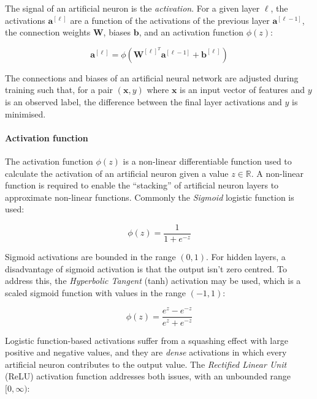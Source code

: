 The signal of an artificial neuron is the \emph{activation}. For a given layer $\ell$, the activations $\bm{a}^{[\ell]}$ are a function of the activations of the previous layer $\bm{a}^{[\ell - 1]}$, the connection weights $\bm{W}$, biases $\bm{b}$, and an activation function $\phi(z)$:

\begin{equation}
  \bm{a}^{[\ell]} = \phi \left( \bm{W}^{[\ell]^T} \bm{a}^{[\ell-1]} + \bm{b}^{[\ell]} \right)
\end{equation}

The connections and biases of an artificial neural network are adjusted during training such that, for a pair $(\bm{x}, y)$ where $\bm{x}$ is an input vector of features and $y$ is an observed label, the difference between the final layer activations and $y$ is minimised.


\paragraph*{Activation function}

The activation function $\phi(z)$ is a non-linear differentiable function used to calculate the activation of an artificial neuron given a value $z \in \mathbb{R}$. A non-linear function is required to enable the ``stacking'' of artificial neuron layers to approximate non-linear functions. Commonly the \emph{Sigmoid} logistic function is used:

\begin{equation}
  \phi(z) = \frac{1}{1 + e^{-z}}
\end{equation}

Sigmoid activations are bounded in the range $(0,1)$.
For hidden layers, a disadvantage of sigmoid activation is that the output isn't zero centred. To address this, the \emph{Hyperbolic Tangent} (tanh) activation may be used, which is a scaled sigmoid function with values in the range $(-1,1)$:

\begin{equation}
  \phi(z) = \frac{e^{z} - e^{-z}}{e^z + e^{-z}}
\end{equation}

Logistic function-based activations suffer from a squashing effect with large positive and negative values, and they are \emph{dense} activations in which every artificial neuron contributes to the output value. The \emph{Rectified Linear Unit} (ReLU) activation function addresses both issues, with an unbounded range $[0,\infty)$:


